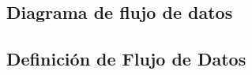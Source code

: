 \documentclass[a4paper,12pt,spanish,twoside]{article}
\begin{document}
\subsection{Diagrama de flujo de datos}


\subsection{Definición de Flujo de Datos}
%
\end{document}
